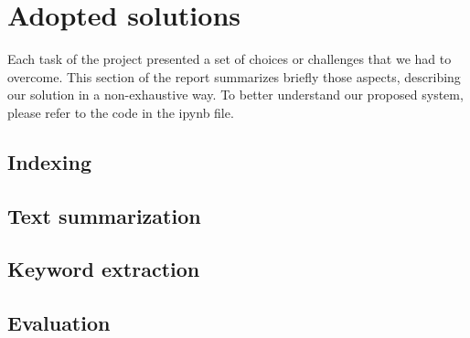 \section{Adopted solutions}
Each task of the project presented a set of choices or challenges that we had to overcome. This section of the report summarizes briefly those aspects, describing our solution in a non-exhaustive way. To better understand our proposed system, please refer to the code in the ipynb file.

\subsection{Indexing}

\subsection{Text summarization}
\subsection{Keyword extraction}
\subsection{Evaluation}